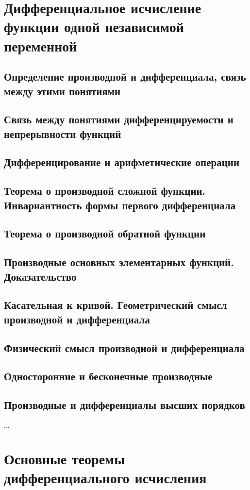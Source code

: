 \section{Дифференциальное исчисление функции одной независимой переменной}
\subsection{Определение производной и дифференциала, связь между этими понятиями}
\subsection{Связь между понятиями дифференцируемости и непрерывности функций}
\subsection{Дифференцирование и арифметические операции}
\subsection{Теорема о производной сложной функции. Инвариантность формы первого дифференциала}
\subsection{Теорема о производной обратной функции}
\subsection{Производные основных элементарных функций. Доказательство}
\subsection{Касательная к кривой. Геометрический смысл производной и дифференциала}
\subsection{Физический смысл производной и дифференциала}
\subsection{Односторонние и бесконечные производные}
\subsection{Производные и дифференциалы высших порядков}
...

\section{Основные теоремы дифференциального исчисления}
